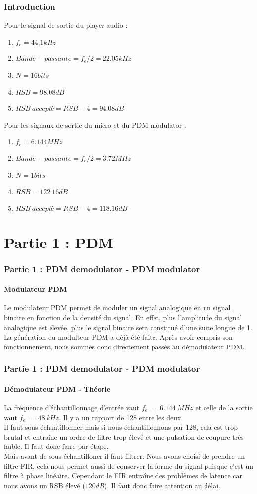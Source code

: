 \documentclass[
10pt,
aspectratio=169,
]{beamer}
\begin{document}
\begin{frame} 
\frametitle{Introduction} 
Pour le signal de sortie du player audio : 
\begin{enumerate} 
\item $f_e = 44.1 kHz$
\item $Bande-passante = f_e/2 = 22.05 kHz$
\item $N = 16 bits$
\item $RSB = 98.08 dB$
\item $RSB ~accepté = RSB - 4 = 94.08 dB$
\end{enumerate}
\vspace*{0.7cm}
Pour les signaux de sortie du micro et du PDM modulator : 
\begin{enumerate} 
\item $f_e = 6.144 MHz$
\item $Bande-passante = f_e/2 = 3.72 MHz$
\item $N = 1 bits$
\item $RSB = 122.16 dB$
\item $RSB~accepté = RSB - 4 = 118.16 dB$
\end{enumerate}
\end{frame}

\section{Partie 1 : PDM}
\begin{frame} 
\frametitle{Partie 1 : PDM demodulator - PDM modulator} 
\framesubtitle{Modulateur PDM} 
Le modulateur PDM permet de moduler un signal analogique en un signal binaire en fonction de la densité du signal. En effet, plus l'amplitude du signal analogique est élevée, plus le signal binaire sera constitué d'une suite longue de 1.\\
\vspace*{0.3cm}
La génération du modulteur PDM a déjà été faite. Après avoir compris son fonctionnement, nous sommes donc directement passés au démodulateur PDM.
\end{frame}

\begin{frame} 
\frametitle{Partie 1 : PDM demodulator - PDM modulator} 
\framesubtitle{Démodulateur PDM - Théorie} 
La fréquence d'échantillonnage d'entrée vaut $f_e~=~6.144~MHz$ et celle de la sortie vaut $f_e~=~48~kHz$. Il y a un rapport de 128 entre les deux.\\
Il faut sous-échantillonner mais si nous échantillonnons par 128, cela est trop brutal et entraîne un ordre de filtre trop élevé et une pulsation de coupure très faible. Il faut donc faire par étape. \\
Mais avant de sous-échantilloner il faut filtrer. Nous avons choisi de prendre un filtre FIR, cela nous permet aussi de conserver la forme du signal puisque c'est un filtre à phase linéaire. Cependant le FIR entraîne des problèmes de latence car nous avons un RSB élevé ($120 dB$). Il faut donc faire attention au délai.
\end{frame}
\end{document}
